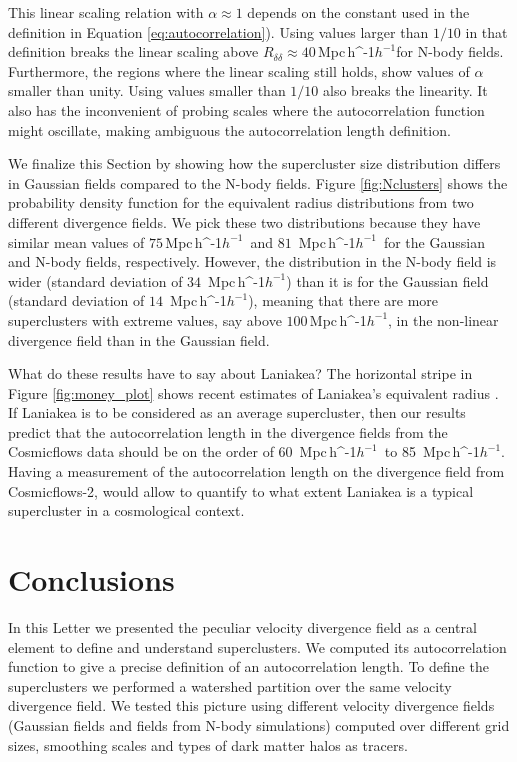 \documentclass[usenatbib]{mnras}
\newcommand{\Mpch}{\,{\rm Mpc}\,\ifmmode h^{-1}\else $h^{-1}$\fi}
\begin{document}
This linear scaling relation with $\alpha\approx 1$ depends on the constant used in the definition in Equation \ref{eq:autocorrelation}). 
Using values larger than $1/10$ in that definition breaks the linear scaling above $R_{\delta\delta}\approx 40$\Mpch for N-body fields. 
Furthermore, the regions where the linear scaling still holds, show values of $\alpha$ smaller than unity. 
Using values smaller than $1/10$ also breaks the linearity. 
It also has the inconvenient of probing scales where the autocorrelation function might oscillate, making ambiguous the autocorrelation length definition.
    
We finalize this Section by showing how the supercluster size distribution differs in Gaussian fields compared to the N-body fields.
Figure \ref{fig:Nclusters} shows the probability density function for the equivalent radius distributions from two different divergence fields.
We pick these two distributions because they have similar mean values of $75$\Mpch\ and $81$ \Mpch\ for the Gaussian and N-body fields, respectively. 
However, the distribution in the N-body field is wider (standard deviation of $34$ \Mpch) than it is for the Gaussian field (standard deviation of $14$ \Mpch), meaning that there are more superclusters with extreme values, say above $100$\Mpch, in the non-linear divergence field than in the Gaussian field. 


What do these results have to say about Laniakea?
The horizontal stripe in Figure \ref{fig:money_plot} shows recent estimates of Laniakea's equivalent radius \citep{Dupuy_2019}. 
If Laniakea is to be considered as an average supercluster, then our results predict that the autocorrelation length in the divergence fields from the Cosmicflows data should be on the order of 60 \Mpch\ to 85 \Mpch.
Having a measurement of the autocorrelation length on the divergence field from Cosmicflows-2, would allow to quantify to what extent Laniakea is a typical supercluster in a cosmological context.
 



\section{Conclusions}
\label{sec:conclusion}


In this Letter we presented the peculiar velocity divergence field as a central element to define and understand superclusters.
We computed its autocorrelation function to give a precise definition of an autocorrelation length. 
To define the superclusters we performed a watershed partition over the same velocity divergence field. 
We tested this picture using different velocity divergence fields (Gaussian fields and fields from N-body simulations) computed over different grid sizes, smoothing scales and types of dark matter halos as tracers.
\end{document}
